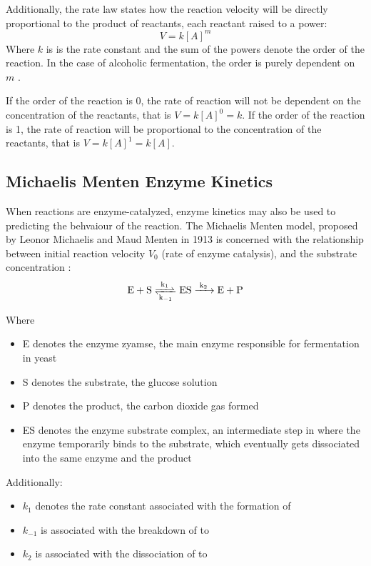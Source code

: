 \documentclass{article}
\begin{document}
Additionally, the rate law states how the reaction velocity will be directly proportional to the product of reactants, each reactant raised to a power:
\begin{equation}
    V = k[A]^m
\end{equation}
Where $k$ is is the rate constant and the sum of the powers denote the order of the reaction. In the case of alcoholic fermentation, the order is purely dependent on $m$ \parencite{ref}.

\medskip

If the order of the reaction is 0, the rate of reaction will not be dependent on the concentration of the reactants, that is $V = k[A]^0 = k$. If the order of the reaction is 1, the rate of reaction will be proportional to the concentration of the reactants, that is $V = k[A]^1 = k[A]$.

\subsection{Michaelis Menten Enzyme Kinetics}
When reactions are enzyme-catalyzed, enzyme kinetics may also be used to predicting the behvaiour of the reaction. The Michaelis Menten model, proposed by Leonor Michaelis and Maud Menten in 1913 is concerned with the relationship between initial reaction velocity $V_0$ (rate of enzyme catalysis), and the substrate concentration \parencite{ref}:
\begin{equation}
    \ce{E + S <=>[k_1][k_{-1}] ES ->[k_2] E + P}
\end{equation}

Where
\begin{itemize}[topsep=\parskip, noitemsep]
    \item E denotes the enzyme zyamse, the main enzyme responsible for fermentation in yeast
    \item S denotes the substrate, the glucose solution
    \item P denotes the product, the carbon dioxide gas formed
    \item ES denotes the enzyme substrate complex, an intermediate step in where the enzyme temporarily binds to the substrate, which eventually gets dissociated into the same enzyme and the product
\end{itemize}

\medskip

Additionally:
\begin{itemize}[topsep=\parskip, noitemsep]
    \item $k_1$ denotes the rate constant associated with the formation of 
    \item $k_{-1}$ is associated with the breakdown of  to 
    \item $k_2$ is associated with the dissociation of  to 
\end{itemize}
\end{document}
